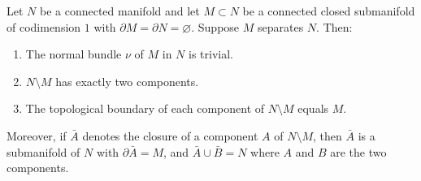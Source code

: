 Let $N$ be a connected manifold and let $M \subset N$ be a connected closed submanifold of codimension $1$ with $\partial M = \partial N = \varnothing$. Suppose $M$ separates $N$. Then:

\begin{enumerate}
\item The normal bundle $\nu$ of $M$ in $N$ is trivial.
\item $N \setminus M$ has exactly two components.
\item The topological boundary of each component of $N \setminus M$ equals $M$.
\end{enumerate}

Moreover, if $\bar{A}$ denotes the closure of a component $A$ of $N \setminus M$, then $\bar{A}$ is a submanifold of $N$ with $\partial \bar{A} = M$, and $\bar{A} \cup \bar{B} = N$ where $A$ and $B$ are the two components.
